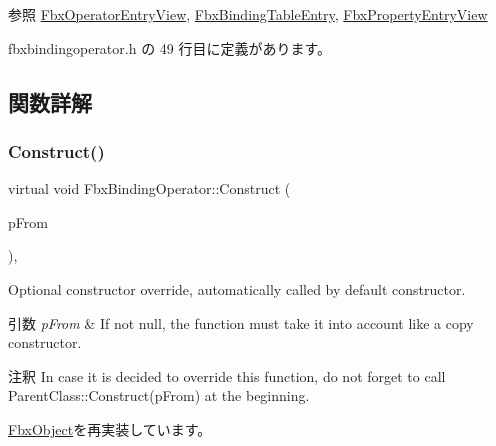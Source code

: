 \begin{DoxySeeAlso}{参照}
\hyperlink{class_fbx_operator_entry_view}{Fbx\+Operator\+Entry\+View}, \hyperlink{class_fbx_binding_table_entry}{Fbx\+Binding\+Table\+Entry}, \hyperlink{class_fbx_property_entry_view}{Fbx\+Property\+Entry\+View} 
\end{DoxySeeAlso}


 fbxbindingoperator.\+h の 49 行目に定義があります。



\subsection{関数詳解}
\mbox{\label{class_fbx_binding_operator_addee18722d7806245f10a1c873bafaac}} 
\subsubsection{\texorpdfstring{Construct()}{Construct()}}
{\footnotesize\ttfamily virtual void Fbx\+Binding\+Operator\+::\+Construct (\begin{DoxyParamCaption}\item[{const \hyperlink{class_fbx_object}{Fbx\+Object} $\ast$}]{p\+From }\end{DoxyParamCaption})\hspace{0.3cm}{\ttfamily [protected]}, {\ttfamily [virtual]}}

Optional constructor override, automatically called by default constructor. 
\begin{DoxyParams}{引数}
{\em p\+From} & If not null, the function must take it into account like a copy constructor. \\
\hline
\end{DoxyParams}
\begin{DoxyRemark}{注釈}
In case it is decided to override this function, do not forget to call Parent\+Class\+::\+Construct(p\+From) at the beginning. 
\end{DoxyRemark}


\hyperlink{class_fbx_object_a313503bc645af3fdceb4a99ef5cea7eb}{Fbx\+Object}を再実装しています。

\mbox{\label{class_fbx_binding_operator_ab7e4a678475a62b3bf36b1171860c17e}} 
